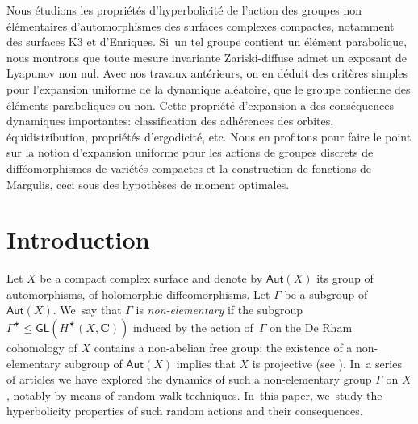 \documentclass[JEP,XML,SOM,Unicode,published]{cedram}
\def\C{\mathbf{C}}
\newcommand\Aut{\mathsf{Aut}}
\newcommand\GL{{\mathsf{GL}}}
\theoremstyle{plain}
\theoremstyle{definition}
\begin{document}

\begin{altabstract}
Nous étudions les propriétés d’hyperbolicité de l’action des groupes non élémentaires d’auto\-morphismes des surfaces complexes compactes, notamment des surfaces K3 et d’Enriques. Si~un tel groupe contient un élément parabolique, nous montrons que toute mesure invariante Zariski-diffuse admet un exposant de Lyapunov non nul. Avec nos travaux antérieurs, on en déduit des critères simples pour l’expansion uniforme de la dynamique aléatoire, que le groupe contienne des éléments paraboliques ou non. Cette propriété d’expansion a des conséquences dynamiques importantes: classification des adhérences des orbites, équidistribution, propriétés d’ergodicité, etc. Nous en profitons pour faire le point sur la notion d’expansion uniforme pour les actions de groupes discrets de difféomorphismes de variétés compactes et la construction de fonctions de Margulis, ceci sous des hypothèses de moment optimales.\end{altabstract}

\maketitle
\vspace*{-\baselineskip}
\tableofcontents
\mainmatter

\section{Introduction}\label{sec:intro}

Let $X$ be a compact complex
surface and denote by $\Aut(X)$ its group of
automorphisms, \ie of holomorphic diffeomorphisms. Let $\Gamma$ be a subgroup of $\Aut(X)$. We~say that $\Gamma$ is \emph{non-elementary} if the subgroup
$\Gamma^\varstar\leq \GL(H^\varstar (X, \C))$ induced by the action of~$\Gamma$ on the De Rham cohomology of $X$ contains a non-abelian free group; the existence of
a non-elementary subgroup of $\Aut(X)$
implies that $X$ is projective (see \cite{Simons}). In~a series of articles \cite{stiffness, finite_orbits, invariant} we have
explored the dynamics of such a non-elementary group $\Gamma$ on $X$, notably by
means of random walk techniques. In~this paper, we~study the hyperbolicity properties of such random actions and their consequences.
\end{document}
